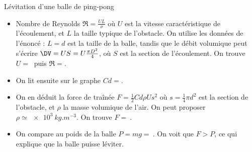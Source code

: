 \begin{exo}[2][oral]{Lévitation d’une balle de ping-pong}
{\begin{itemize}
    \begin{itemize}
      \item
    Nombre de Reynolds $\Re = \frac{UL}{\nu}$ où $U$ est la vitesse caractéristique de l'écoulement, et $L$ la taille typique de l'obstacle. On utilise les données de l'énoncé : $L=d$ est la taille de la balle, tandis que le débit volumique peut s'écrire $\DV = U S = U \frac{\pi D^2}{4}$, où $S$ est la section de l'écoulement. On trouve $U=\SI{}{}$ puis $\Re = $.
    \item On lit ensuite sur le graphe $Cd = $.
    \item On en déduit la force de traînée $F = \frac{1}{2} Cd \rho U s^2$ où $s=\frac{1}{4}\pi d^2$
    est la section de l'obstacle, et $\rho$ la masse volumique de l'air. On peut proposer $\rho \simeq \SI{e3}{kg.m^{-3}}$. On trouve $F = \SI{}{}$.
    \item On compare au poids de la balle $P=mg = \SI{}{}$. On voit que $F>P$, ce qui explique que la balle puisse léviter.
  \end{itemize}
  \end{itemize}
  }
  \end{exo}
